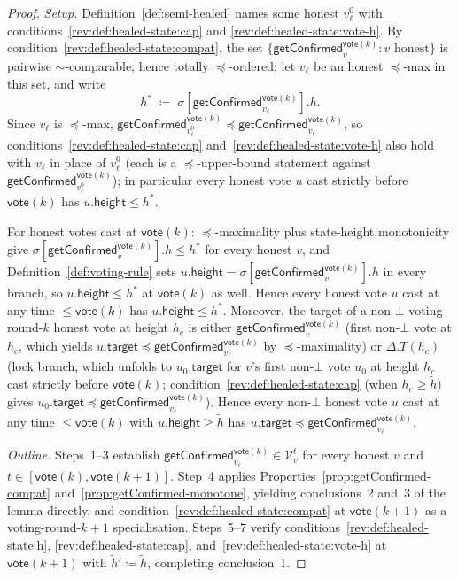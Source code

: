 \ifx\litemode\undefined\documentclass{article}\fi
\newcommand{\V}[0]{\ensuremath{\mathcal{V}}}
\newcommand{\target}{\mathsf{target}}
\newcommand{\height}{\mathsf{height}}
\newcommand{\vote}{\ensuremath{\mathsf{vote}}}
\newcommand{\comm}[1]{\ensuremath{\widetilde{#1}}}
\newcommand{\getConfirmed}{\textsf{getConfirmed}\xspace}
\theoremstyle{plain}
\theoremstyle{definition}
\theoremstyle{remark}
\begin{document}
\begin{proof}

\emph{Setup.}
Definition~\ref{def:semi-healed} names some honest $v_\ell^0$ with conditions~\ref{rev:def:healed-state:cap} and \ref{rev:def:healed-state:vote-h}.
By condition~\ref{rev:def:healed-state:compat}, the set $\{\getConfirmed_v^{\vote(k)} : v \text{ honest}\}$ is pairwise $\sim$-comparable, hence totally $\preceq$-ordered;
let $v_\ell$ be an honest $\preceq$-max in this set, and write
\[
  h^\ast \;\coloneqq\; \sigma[\getConfirmed_{v_\ell}^{\vote(k)}].h.
\]
Since $v_\ell$ is $\preceq$-max, $\getConfirmed_{v_\ell^0}^{\vote(k)} \preceq \getConfirmed_{v_\ell}^{\vote(k)}$, so conditions~\ref{rev:def:healed-state:cap} and~\ref{rev:def:healed-state:vote-h} also hold with $v_\ell$ in place of $v_\ell^0$ (each is a $\preceq$-upper-bound statement against $\getConfirmed_{v_\ell^0}^{\vote(k)}$);
in particular every honest vote $u$ cast strictly before $\vote(k)$ has $u.\height \leq h^\ast$.

For honest votes cast at $\vote(k)$:
$\preceq$-maximality plus state-height monotonicity give $\sigma[\getConfirmed_v^{\vote(k)}].h \leq h^\ast$ for every honest $v$, and Definition~\ref{def:voting-rule} sets $u.\height = \sigma[\getConfirmed_v^{\vote(k)}].h$ in every branch, so $u.\height \leq h^\ast$ at $\vote(k)$ as well.
Hence every honest vote $u$ cast at any time $\leq \vote(k)$ has $u.\height \leq h^\ast$.
Moreover, the target of a non-$\bot$ voting-round-$k$ honest vote at height $h_c$ is either $\getConfirmed_v^{\vote(k)}$ (first non-$\bot$ vote at $h_c$, which yields $u.\target \preceq \getConfirmed_{v_\ell}^{\vote(k)}$ by $\preceq$-maximality) or $\Delta.T(h_c)$ (lock branch, which unfolds to $u_0.\target$ for $v$'s first non-$\bot$ vote $u_0$ at height $h_c$ cast strictly before $\vote(k)$; condition~\ref{rev:def:healed-state:cap} (when $h_c \geq \comm{h}$) gives $u_0.\target \preceq \getConfirmed_{v_\ell}^{\vote(k)}$).
Hence every non-$\bot$ honest vote $u$ cast at any time $\leq \vote(k)$ with $u.\height \geq \comm{h}$ has $u.\target \preceq \getConfirmed_{v_\ell}^{\vote(k)}$.

\emph{Outline.}
Steps~1--3 establish $\getConfirmed_{v_\ell}^{\vote(k)} \in \V_v^t$ for every honest $v$ and $t \in [\vote(k), \vote(k{+}1)]$.
Step~4 applies Properties~\ref{prop:getConfirmed-compat} and~\ref{prop:getConfirmed-monotone}, yielding conclusions~2 and~3 of the lemma directly, and condition~\ref{rev:def:healed-state:compat} at $\vote(k{+}1)$ as a voting-round-$k{+}1$ specialisation.
Steps~5--7 verify conditions~\ref{rev:def:healed-state:h}, \ref{rev:def:healed-state:cap}, and~\ref{rev:def:healed-state:vote-h} at $\vote(k{+}1)$ with $\comm{h}' \coloneqq \comm{h}$, completing conclusion~1.


\end{proof}
\end{document}
